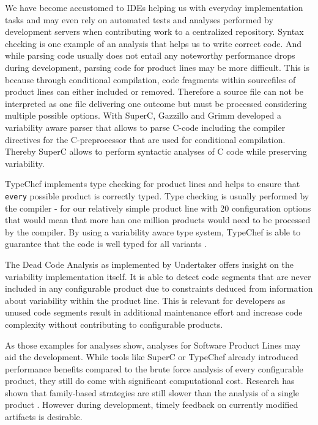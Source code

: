 \documentclass[a4paper]{article}
\begin{document}
We have become accustomed to IDEs helping us with everyday implementation tasks and may even rely on automated tests and analyses performed by development servers when contributing work to a centralized repository. Syntax checking is one example of an analysis that helps us to write correct code. And while parsing code usually does not entail any noteworthy performance drops during development, parsing code for product lines may be more difficult. This is because through conditional compilation, code fragments within sourcefiles of product lines can either included or removed. Therefore a source file can not be interpreted as one file delivering one outcome but must be processed considering multiple possible options. With SuperC, Gazzillo and Grimm \cite{gazzillo-grimm} developed a variability aware parser that allows to parse C-code including the compiler directives for the C-preprocessor that are used for conditional compilation. Thereby SuperC allows to perform syntactic analyses of C code while preserving variability. 

TypeChef implements type checking for product lines and helps to ensure that \texttt{every} possible product is correctly typed. Type checking is usually performed by the compiler - for our relatively simple product line with 20 configuration options that would mean that more han one million products would need to be processed by the compiler. By using a variability aware type system, TypeChef is able to guarantee that the code is well typed for all variants \cite{Kenner:2010:TTT:1868688.1868693}.

The Dead Code Analysis as implemented by Undertaker \cite{Tartler:2011:FCC:1966445.1966451} offers insight on the variability implementation itself. It is able to detect code segments that are never included in any configurable product due to constraints deduced from information about variability within the product line. This is relevant for developers as unused code segments result in additional maintenance effort and increase code complexity without contributing to configurable products.

As those examples for analyses show, analyses for Software Product Lines may aid the development. While tools like SuperC or TypeChef already introduced performance benefits compared to the brute force analysis of every configurable product, they still do come with significant computational cost. Research has shown that family-based strategies are still slower than the analysis of a single product \cite{Thum:2014:CSA:2620784.2580950}. However during development, timely feedback on currently modified artifacts is desirable.
\end{document}
